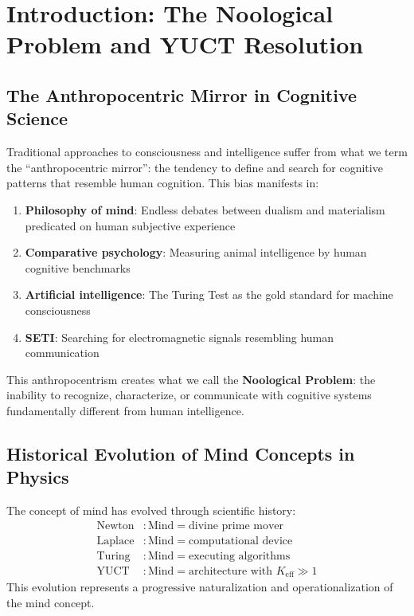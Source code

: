 \documentclass[12pt,a4paper]{article}
\newcommand{\Ke}{K_{\mathrm{eff}}}
\begin{document}
	\tableofcontents
	
	\newpage
	
	\section{Introduction: The Noological Problem and YUCT Resolution}
	
	\subsection{The Anthropocentric Mirror in Cognitive Science}
	
	Traditional approaches to consciousness and intelligence suffer from what we term the ``anthropocentric mirror'': the tendency to define and search for cognitive patterns that resemble human cognition. This bias manifests in:
	\begin{enumerate}
		\item \textbf{Philosophy of mind}: Endless debates between dualism and materialism predicated on human subjective experience
		\item \textbf{Comparative psychology}: Measuring animal intelligence by human cognitive benchmarks
		\item \textbf{Artificial intelligence}: The Turing Test as the gold standard for machine consciousness
		\item \textbf{SETI}: Searching for electromagnetic signals resembling human communication
	\end{enumerate}
	This anthropocentrism creates what we call the \textbf{Noological Problem}: the inability to recognize, characterize, or communicate with cognitive systems fundamentally different from human intelligence.
	
	\subsection{Historical Evolution of Mind Concepts in Physics}
	
	The concept of mind has evolved through scientific history:
	\[
	\begin{aligned}
		\text{Newton} &: \text{Mind} = \text{divine prime mover} \\
		\text{Laplace} &: \text{Mind} = \text{computational device} \\
		\text{Turing} &: \text{Mind} = \text{executing algorithms} \\
		\text{YUCT} &: \text{Mind} = \text{architecture with } \Ke \gg 1
	\end{aligned}
	\]
	This evolution represents a progressive naturalization and operationalization of the mind concept.
	
\end{document}
